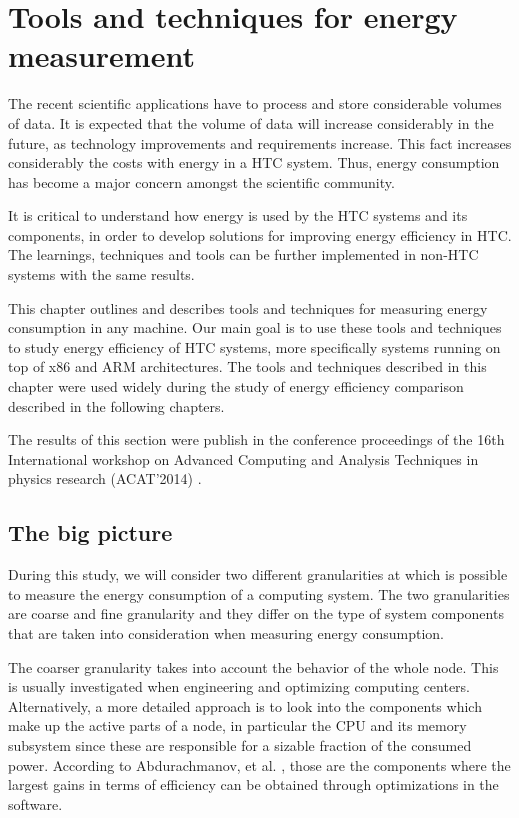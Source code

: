 \chapter{Tools and techniques for energy measurement}


The recent scientific applications have to process and store
considerable volumes of data. It is expected that the volume of
data will increase considerably in the future, as technology improvements and
requirements increase. This fact increases considerably
the costs with energy in a HTC system. Thus, energy consumption has
become a major concern amongst the scientific community.

It is critical to understand how energy is used by the HTC systems and its components, in order to develop solutions for improving energy efficiency in HTC. The learnings, techniques and tools can be further implemented in non-HTC systems with the same results.

This chapter outlines and describes tools and techniques for measuring energy consumption in any machine. Our main goal is to use these tools and techniques to study energy efficiency of HTC systems, more specifically systems running on top of x86 and ARM architectures. The tools and techniques described in this chapter were used widely during the study of energy efficiency comparison described in the following chapters. 


The results of this section were publish in the conference proceedings of the 16th International workshop on Advanced Computing and Analysis Techniques in physics research (ACAT'2014) \cite{ACAT}.

\section{The big picture}

During this study, we will consider two different granularities at which is possible to measure the energy consumption of a computing system. The two granularities are coarse and fine granularity and they differ on the type of system components that are taken into consideration when measuring energy consumption.

The coarser granularity takes into account the behavior of the whole node. This is usually investigated when
engineering and optimizing computing centers. Alternatively, a more detailed approach is to
look into the components which make up the active parts of a
node, in particular the CPU and its memory subsystem since these
are responsible for a sizable fraction of the consumed power.
According to Abdurachmanov, et al. \cite{ACAT}, those are the components where the largest gains in terms of efficiency 
can be obtained through optimizations in the software.

